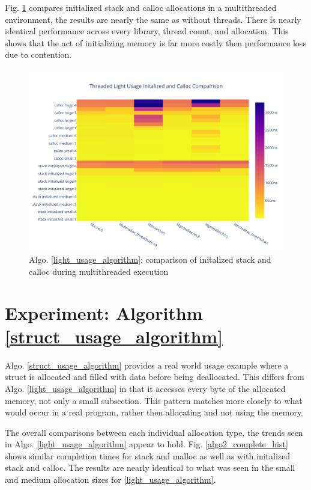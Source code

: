 \documentclass[letterpaper, 10 pt, conference]{ieeeconf}  %
\begin{document}
Fig. \ref{algo1_init_calloc_threaded_hist} compares initialized stack and calloc allocations in a multithreaded environment, the results are nearly the same as without threads.
There is nearly identical performance across every library, thread count, and allocation.
This shows that  the act of initializing memory is far more costly then performance loss due to contention.

\begin{figure}[tbh!]
  \centering
  \includegraphics[width=\columnwidth]{graphs/light_init_calloc_threaded_hist.png}
  \caption{ Algo. \ref{light_usage_algorithm}: comparison of initalized stack and calloc during multithreaded execution }
  \label{algo1_init_calloc_threaded_hist}
\end{figure}

\section{Experiment: Algorithm \ref{struct_usage_algorithm}}

Algo. \ref{struct_usage_algorithm} provides a real world usage example where a struct is allocated and filled with data before being deallocated.
This differs from Algo. \ref{light_usage_algorithm} in that it accesses every byte of the allocated memory, not only a small subsection.
This pattern matches more closely to what would occur in a real program, rather then allocating and not using the memory.

The overall comparisons between each individual allocation type, the trends seen in Algo. \ref{light_usage_algorithm} appear to hold.
Fig. \ref{algo2_complete_hist} shows similar completion times for stack and malloc as well as with initalized stack and calloc.
The results are nearly identical to what was seen in the small and medium allocation sizes for \ref{light_usage_algorithm}.
\end{document}
